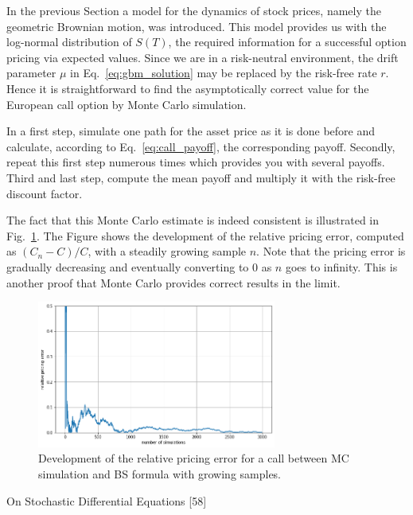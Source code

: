 In the previous Section a model for the dynamics of
stock prices, namely the geometric Brownian motion, was introduced. This
model provides us with the log-normal distribution of $S(T)$, the required
information for a successful option pricing via expected values. Since
we are in a risk-neutral environment, the drift parameter $\mu$ in Eq.~\ref{eq:gbm_solution}
may be replaced by the risk-free rate $r$. Hence it is
straightforward to find the asymptotically correct value for the
European call option by Monte Carlo simulation. 

In a first step, simulate one path for the asset price as it is done 
before and calculate, according to Eq.~\ref{eq:call_payoff}, the corresponding payoff. 
Secondly, repeat this first step numerous times which provides you with several
payoffs. Third and last step, compute the mean payoff and multiply it
with the risk-free discount factor. 

The fact that this Monte Carlo estimate is indeed consistent is illustrated 
in Fig.~\ref{fig:error_BS}. The Figure shows the development of the relative pricing error, 
computed as $(C_n − C)/C$, with a steadily growing sample $n$.
Note that the pricing error is gradually
decreasing and eventually converting to 0 as $n$ goes to infinity. This is
another proof that Monte Carlo provides correct results in the limit.

\begin{figure}[htb]
	\centering
	\includegraphics[width=0.7\textwidth]{figures/call_pricing_error.png}
	\caption{Development of the relative pricing error for a call between MC simulation and BS formula with growing samples.}
	\label{fig:error_BS}
\end{figure}

\begin{thebibliography}{9}
	On Stochastic Differential Equations {[}58{]}
\end{thebibliography}









